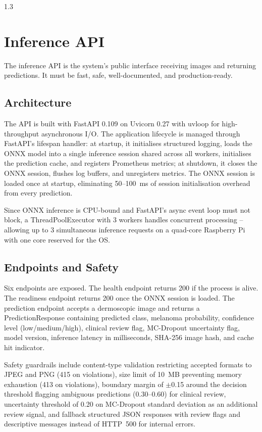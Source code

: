 \begin{spacing}{1.3}
\section{Inference API}

The inference API is the system's public interface receiving images and returning predictions. It must be fast, safe, well-documented, and production-ready.

\subsection{Architecture}

The API is built with FastAPI 0.109 on Uvicorn 0.27 with uvloop for high-throughput asynchronous I/O. The application lifecycle is managed through FastAPI's lifespan handler: at startup, it initialises structured logging, loads the ONNX model into a single inference session shared across all workers, initialises the prediction cache, and registers Prometheus metrics; at shutdown, it closes the ONNX session, flushes log buffers, and unregisters metrics. The ONNX session is loaded once at startup, eliminating 50--100~ms of session initialisation overhead from every prediction.

Since ONNX inference is CPU-bound and FastAPI's async event loop must not block, a ThreadPoolExecutor with 3 workers handles concurrent processing -- allowing up to 3 simultaneous inference requests on a quad-core Raspberry Pi with one core reserved for the OS.

\subsection{Endpoints and Safety}

Six endpoints are exposed. The health endpoint returns 200 if the process is alive. The readiness endpoint returns 200 once the ONNX session is loaded. The prediction endpoint accepts a dermoscopic image and returns a PredictionResponse containing predicted class, melanoma probability, confidence level (low/medium/high), clinical review flag, MC-Dropout uncertainty flag, model version, inference latency in milliseconds, SHA-256 image hash, and cache hit indicator.

Safety guardrails include content-type validation restricting accepted formats to JPEG and PNG (415 on violations), size limit of 10~MB preventing memory exhaustion (413 on violations), boundary margin of $\pm$0.15 around the decision threshold flagging ambiguous predictions (0.30--0.60) for clinical review, uncertainty threshold of 0.20 on MC-Dropout standard deviation as an additional review signal, and fallback structured JSON responses with review flags and descriptive messages instead of HTTP~500 for internal errors.


\end{spacing}
